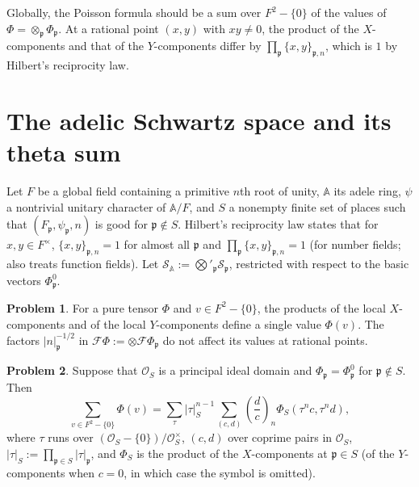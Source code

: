 \documentclass[reqno]{amsart}
\providecommand{\qr}[2]{\left(\frac{#1}{#2}\right)}
\newcommand{\Fc}{\mathcal{F}}
\newcommand{\Sc}{\mathcal{S}}
\newcommand{\Ab}{\mathbb{A}}
\newcommand{\pp}{\mathfrak{p}}
\numberwithin{equation}{section}
\theoremstyle{definition}
\newtheorem{problem}{Problem}[section]
\theoremstyle{plain}
\begin{document}
Globally, the Poisson formula should be a sum over $F^2 - \{0\}$ of the values of $\Phi = \otimes_\pp \Phi_\pp$.  At a rational point $(x, y)$ with $x y \neq 0$, the product of the $X$-components and that of the $Y$-components differ by $\prod_\pp \{x, y\}_{\pp, n}$, which is $1$ by Hilbert's reciprocity law.

\section{The adelic Schwartz space and its theta sum}\label{sec:adelic}

Let $F$ be a global field containing a primitive $n$th root of unity, $\Ab$ its adele ring, $\psi$ a nontrivial unitary character of $\Ab / F$, and $S$ a nonempty finite set of places such that $(F_\pp, \psi_\pp, n)$ is good for $\pp \notin S$.  Hilbert's reciprocity law states that for $x, y \in F^\times$, $\{x, y\}_{\pp, n} = 1$ for almost all $\pp$ and $\prod_\pp \{x, y\}_{\pp, n} = 1$ \cite[Ch.~VI, Theorem~8.1]{Neu} (for number fields; \cite{N} also treats function fields).  Let $\Sc_\Ab := \bigotimes'_\pp \Sc_\pp$, restricted with respect to the basic vectors $\Phi_\pp^0$.

\begin{problem}\label{pr:global-values}
  For a pure tensor $\Phi$ and $v \in F^2 - \{0\}$, the products of the local $X$-components and of the local $Y$-components define a single value $\Phi(v)$.  The factors $\lvert n \rvert_\pp^{-1/2}$ in $\Fc \Phi := \otimes \Fc \Phi_\pp$ do not affect its values at rational points.
\end{problem}

\begin{problem}\label{pr:theta-S}
  Suppose that $\mathcal{O}_S$ is a principal ideal domain and $\Phi_\pp = \Phi_\pp^0$ for $\pp \notin S$.  Then
  \begin{equation*}
    \sum_{v \in F^2 - \{0\}} \Phi(v) = \sum_{\tau} \lvert \tau \rvert_S^{n-1} \sum_{(c, d)} \qr{d}{c}_n \Phi_S(\tau^n c, \tau^n d),
  \end{equation*}
  where $\tau$ runs over $(\mathcal{O}_S - \{0\}) / \mathcal{O}_S^\times$, $(c, d)$ over coprime pairs in $\mathcal{O}_S$, $\lvert \tau \rvert_S := \prod_{\pp \in S} \lvert \tau \rvert_\pp$, and $\Phi_S$ is the product of the $X$-components at $\pp \in S$ (of the $Y$-components when $c = 0$, in which case the symbol is omitted).
\end{problem}
\end{document}
